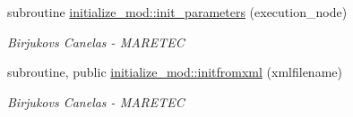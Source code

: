 \begin{DoxyCompactItemize}
subroutine \hyperlink{namespaceinitialize__mod_aac9d9dabb797c83e360f9ae60a7e65e3}{initialize\+\_\+mod\+::init\+\_\+parameters} (execution\+\_\+node)
\begin{DoxyCompactList}\small\item\em Birjukovs Canelas -\/ M\+A\+R\+E\+T\+EC \end{DoxyCompactList}\item 
subroutine, public \hyperlink{namespaceinitialize__mod_a107012ffec69fe2d7c524d240193439e}{initialize\+\_\+mod\+::initfromxml} (xmlfilename)
\begin{DoxyCompactList}\small\item\em Birjukovs Canelas -\/ M\+A\+R\+E\+T\+EC \end{DoxyCompactList}\end{DoxyCompactItemize}
